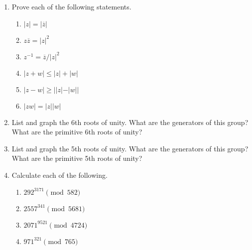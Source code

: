 \documentclass[12pt,reqno]{amsart}
\begin{document}
\begin{enumerate}[{\bf 1.}]
\begin{multicols}{2}
\begin{enumerate}
\end{enumerate}
\end{multicols}

  
  \item
Prove each of the following statements.
\begin{multicols}{2}
\begin{enumerate}
 
 \item
$|z| = | \overline{z}|$

\item
$z \overline{z} = |z|^2$
 
 \item
$z^{-1} = \overline{z} / |z|^2$

 \item
$|z +w| \leq |z| + |w|$
 
 \item
$|z - w| \geq | |z| - |w||$
 
 \item
$|z w| = |z|  |w|$
 
\end{enumerate}
\end{multicols}


\item
List and graph the 6th roots of unity.  What are the generators of
this group?  What are the primitive 6th roots of unity?
 
 
\item
List and graph the 5th roots of unity.  What are the generators of
this group?  What are the primitive 5th roots of unity? 
 
 
  
\item
Calculate each of the following.
\begin{multicols}{2}
\begin{enumerate}
 
 \item
$292^{3171} \pmod{ 582}$

\item
$2557^{ 341} \pmod{ 5681}$

 \item
$2071^{ 9521} \pmod{ 4724}$
 
 \item
$971^{ 321} \pmod{ 765}$
 
\end{enumerate}
\end{multicols}
 
 
  

\end{enumerate}
\end{document}
